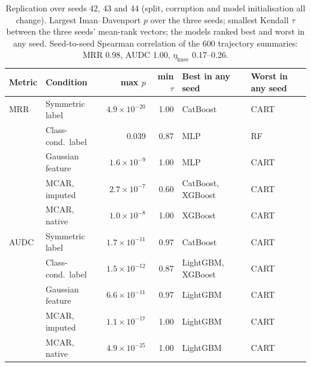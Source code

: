 \begin{table}[t]
\centering
\footnotesize
\setlength{\tabcolsep}{4pt}
\caption{Replication over seeds 42, 43 and 44 (split, corruption and model initialisation all change). Largest Iman--Davenport $p$ over the three seeds; smallest Kendall $\tau$ between the three seeds' mean-rank vectors; the models ranked best and worst in any seed. Seed-to-seed Spearman correlation of the 600 trajectory summaries: MRR 0.98, AUDC 1.00, $\eta_{\mathrm{knee}}$ 0.17--0.26.}
\label{tab:seeds}
\begin{tabular}{@{}llrrll@{}}
\toprule
Metric & Condition & max $p$ & min $\tau$ & Best in any seed & Worst in any seed \\
\midrule
MRR & Symmetric label & $4.9\times10^{-20}$ & 1.00 & CatBoost & CART \\
 & Class-cond.\ label & 0.039 & 0.87 & MLP & RF \\
 & Gaussian feature & $1.6\times10^{-9}$ & 1.00 & MLP & CART \\
 & MCAR, imputed & $2.7\times10^{-7}$ & 0.60 & CatBoost, XGBoost & CART \\
 & MCAR, native & $1.0\times10^{-8}$ & 1.00 & XGBoost & CART \\
\midrule
AUDC & Symmetric label & $1.7\times10^{-11}$ & 0.97 & CatBoost & CART \\
 & Class-cond.\ label & $1.5\times10^{-12}$ & 0.87 & LightGBM, XGBoost & CART \\
 & Gaussian feature & $6.6\times10^{-11}$ & 0.97 & LightGBM & CART \\
 & MCAR, imputed & $1.1\times10^{-17}$ & 1.00 & LightGBM & CART \\
 & MCAR, native & $4.9\times10^{-25}$ & 1.00 & LightGBM & CART \\
\bottomrule
\end{tabular}
\end{table}
